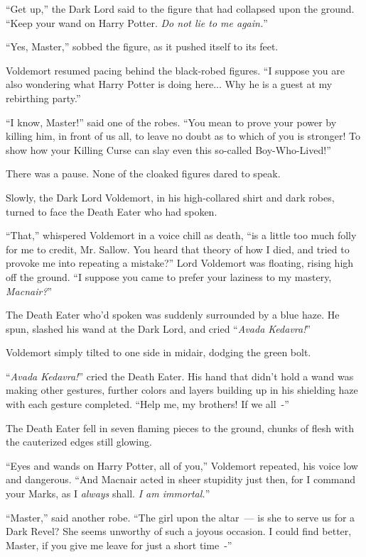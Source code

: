 ``Get up,'' the Dark Lord said to the figure that had collapsed upon the ground. ``Keep your wand on Harry Potter. \emph{Do not lie to me again.}''

``Yes, Master,'' sobbed the figure, as it pushed itself to its feet.

Voldemort resumed pacing behind the black-robed figures. ``I suppose you are also wondering what Harry Potter is doing here... Why he is a guest at my rebirthing party.''

``I know, Master!'' said one of the robes. ``You mean to prove your power by killing him, in front of us all, to leave no doubt as to which of you is stronger! To show how your Killing Curse can slay even this so-called Boy-Who-Lived!''

There was a pause. None of the cloaked figures dared to speak.

Slowly, the Dark Lord Voldemort, in his high-collared shirt and dark robes, turned to face the Death Eater who had spoken.

``That,'' whispered Voldemort in a voice chill as death, ``is a little too much folly for me to credit, Mr. Sallow. You heard that theory of how I died, and tried to provoke me into repeating a mistake?'' Lord Voldemort was floating, rising high off the ground. ``I suppose you came to prefer your laziness to my mastery, \emph{Macnair?}''

The Death Eater who'd spoken was suddenly surrounded by a blue haze. He spun, slashed his wand at the Dark Lord, and cried ``\emph{Avada Kedavra!}''

Voldemort simply tilted to one side in midair, dodging the green bolt.

``\emph{Avada Kedavra!}'' cried the Death Eater. His hand that didn't hold a wand was making other gestures, further colors and layers building up in his shielding haze with each gesture completed. ``Help me, my brothers! If we all~-''

The Death Eater fell in seven flaming pieces to the ground, chunks of flesh with the cauterized edges still glowing.

``Eyes and wands on Harry Potter, all of you,'' Voldemort repeated, his voice low and dangerous. ``And Macnair acted in sheer stupidity just then, for I command your Marks, as I \emph{always} shall. \emph{I am immortal.}''

``Master,'' said another robe. ``The girl upon the altar~--- is she to serve us for a Dark Revel? She seems unworthy of such a joyous occasion. I could find better, Master, if you give me leave for just a short time~-''

